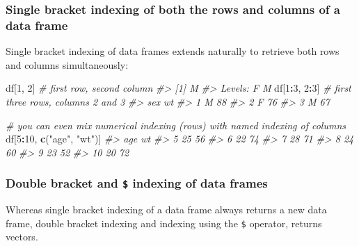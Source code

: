 \documentclass[]{book}
\newenvironment{Shaded}{\begin{snugshade}}{\end{snugshade}}
\newcommand{\CommentTok}[1]{\textcolor[rgb]{0.56,0.35,0.01}{\textit{#1}}}
\newcommand{\DecValTok}[1]{\textcolor[rgb]{0.00,0.00,0.81}{#1}}
\newcommand{\KeywordTok}[1]{\textcolor[rgb]{0.13,0.29,0.53}{\textbf{#1}}}
\newcommand{\NormalTok}[1]{#1}
\newcommand{\OperatorTok}[1]{\textcolor[rgb]{0.81,0.36,0.00}{\textbf{#1}}}
\newcommand{\StringTok}[1]{\textcolor[rgb]{0.31,0.60,0.02}{#1}}
\theoremstyle{definition}
\theoremstyle{definition}
\theoremstyle{definition}
\theoremstyle{remark}
\begin{document}
\hypertarget{single-bracket-indexing-of-both-the-rows-and-columns-of-a-data-frame}{%
\subsubsection{Single bracket indexing of both the rows and columns of a
data
frame}\label{single-bracket-indexing-of-both-the-rows-and-columns-of-a-data-frame}}

Single bracket indexing of data frames extends naturally to retrieve
both rows and columns simultaneously:

\begin{Shaded}
\begin{Highlighting}[]
\NormalTok{df[}\DecValTok{1}\NormalTok{, }\DecValTok{2}\NormalTok{]  }\CommentTok{# first row, second column}
\CommentTok{#> [1] M}
\CommentTok{#> Levels: F M}
\NormalTok{df[}\DecValTok{1}\OperatorTok{:}\DecValTok{3}\NormalTok{, }\DecValTok{2}\OperatorTok{:}\DecValTok{3}\NormalTok{] }\CommentTok{# first three rows, columns 2 and 3}
\CommentTok{#>   sex wt}
\CommentTok{#> 1   M 88}
\CommentTok{#> 2   F 76}
\CommentTok{#> 3   M 67}

\CommentTok{# you can even mix numerical indexing (rows) with named indexing of columns}
\NormalTok{df[}\DecValTok{5}\OperatorTok{:}\DecValTok{10}\NormalTok{, }\KeywordTok{c}\NormalTok{(}\StringTok{"age"}\NormalTok{, }\StringTok{"wt"}\NormalTok{)]  }
\CommentTok{#>    age wt}
\CommentTok{#> 5   25 56}
\CommentTok{#> 6   22 74}
\CommentTok{#> 7   28 71}
\CommentTok{#> 8   24 60}
\CommentTok{#> 9   23 52}
\CommentTok{#> 10  20 72}
\end{Highlighting}
\end{Shaded}

\hypertarget{double-bracket-and-indexing-of-data-frames}{%
\subsubsection{\texorpdfstring{Double bracket and \texttt{\$} indexing
of data
frames}{Double bracket and \$ indexing of data frames}}\label{double-bracket-and-indexing-of-data-frames}}

Whereas single bracket indexing of a data frame always returns a new
data frame, double bracket indexing and indexing using the \texttt{\$}
operator, returns vectors.

\begin{Shaded}
\end{Shaded}
\end{document}
